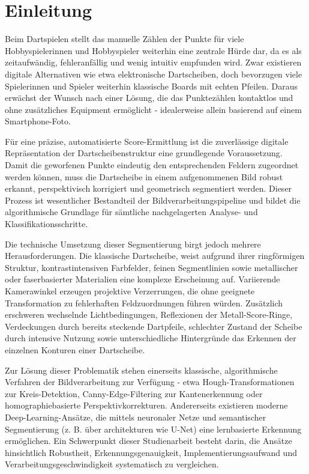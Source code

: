\chapter{Einleitung}

Beim Dartspielen stellt das manuelle Zählen der Punkte für viele Hobbyspielerinnen und Hobbyspieler weiterhin eine zentrale Hürde dar, da es als zeitaufwändig, fehleranfällig und wenig intuitiv empfunden wird. Zwar existieren digitale Alternativen wie etwa elektronische Dartscheiben, doch bevorzugen viele Spielerinnen und Spieler weiterhin klassische Boards mit echten Pfeilen. Daraus erwächst der Wunsch nach einer Lösung, die das Punktezählen kontaktlos und ohne zusätzliches Equipment ermöglicht - idealerweise allein basierend auf einem Smartphone-Foto.

Für eine präzise, automatisierte Score-Ermittlung ist die zuverlässige digitale Repräsentation der Dartscheibenstruktur eine grundlegende Voraussetzung. Damit die geworfenen Punkte eindeutig den entsprechenden Feldern zugeordnet werden können, muss die Dartscheibe in einem aufgenommenen Bild robust erkannt, perspektivisch korrigiert und geometrisch segmentiert werden. Dieser Prozess ist wesentlicher Bestandteil der Bildverarbeitungspipeline und bildet die algorithmische Grundlage für sämtliche nachgelagerten Analyse- und Klassifikationsschritte.

Die technische Umsetzung dieser Segmentierung birgt jedoch mehrere Herausforderungen. Die klassische Dartscheibe, weist aufgrund ihrer ringförmigen Struktur, kontrastintensiven Farbfelder, feinen Segmentlinien sowie metallischer oder faserbasierter Materialien eine komplexe Erscheinung auf. Variierende Kamerawinkel erzeugen projektive Verzerrungen, die ohne geeignete Transformation zu fehlerhaften Feldzuordnungen führen würden. Zusätzlich erschweren wechselnde Lichtbedingungen, Reflexionen der Metall-Score-Ringe, Verdeckungen durch bereits steckende Dartpfeile, schlechter Zustand der Scheibe durch intensive Nutzung sowie unterschiedliche Hintergründe das Erkennen der einzelnen Konturen einer Dartscheibe. 

Zur Lösung dieser Problematik stehen einerseits klassische, algorithmische Verfahren der Bildverarbeitung zur Verfügung - etwa Hough-Transformationen zur Kreis-Detektion, Canny-Edge-Filtering zur Kantenerkennung oder homographiebasierte Perspektivkorrekturen. Andererseits existieren moderne Deep-Learning-Ansätze, die mittels neuronaler Netze und semantischer Segmentierung (z. B. über architekturen wie U-Net) eine lernbasierte Erkennung ermöglichen. Ein Schwerpunkt dieser Studienarbeit besteht darin, die Ansätze hinsichtlich Robustheit, Erkennungsgenauigkeit, Implementierungsaufwand und Verarbeitungsgeschwindigkeit systematisch zu vergleichen.

